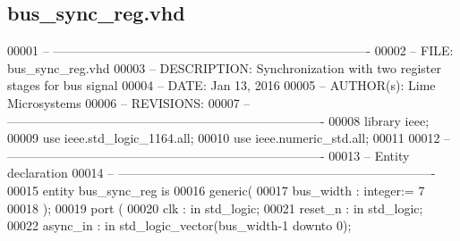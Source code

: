 \subsection{bus\+\_\+sync\+\_\+reg.\+vhd}
\label{bus__sync__reg_8vhd_source}

\begin{DoxyCode}
00001 \textcolor{keyword}{-- ---------------------------------------------------------------------------- }
00002 \textcolor{keyword}{-- FILE:    bus\_sync\_reg.vhd}
00003 \textcolor{keyword}{-- DESCRIPTION: Synchronization with two register stages for bus signal}
00004 \textcolor{keyword}{-- DATE:    Jan 13, 2016}
00005 \textcolor{keyword}{-- AUTHOR(s):   Lime Microsystems}
00006 \textcolor{keyword}{-- REVISIONS:}
00007 \textcolor{keyword}{-- ---------------------------------------------------------------------------- }
00008 \textcolor{vhdlkeyword}{library }\textcolor{keywordflow}{ieee};
00009 \textcolor{vhdlkeyword}{use }ieee.std\_logic\_1164.\textcolor{keywordflow}{all};
00010 \textcolor{vhdlkeyword}{use }ieee.numeric\_std.\textcolor{keywordflow}{all};
00011 
00012 \textcolor{keyword}{-- ----------------------------------------------------------------------------}
00013 \textcolor{keyword}{-- Entity declaration}
00014 \textcolor{keyword}{-- ----------------------------------------------------------------------------}
00015 \textcolor{keywordflow}{entity }bus_sync_reg \textcolor{keywordflow}{is}
00016    \textcolor{keywordflow}{generic}\textcolor{vhdlchar}{(}
00017       \textcolor{vhdlchar}{bus_width}   \textcolor{vhdlchar}{:} \textcolor{comment}{integer}\textcolor{vhdlchar}{:=} \textcolor{vhdllogic}{}\textcolor{vhdllogic}{7}
00018    \textcolor{vhdlchar}{)};
00019    \textcolor{keywordflow}{port} \textcolor{vhdlchar}{(}
00020       \textcolor{vhdlchar}{clk}         \textcolor{vhdlchar}{:} \textcolor{keywordflow}{in} \textcolor{comment}{std\_logic};
00021       \textcolor{vhdlchar}{reset_n}     \textcolor{vhdlchar}{:} \textcolor{keywordflow}{in} \textcolor{comment}{std\_logic};
00022       \textcolor{vhdlchar}{async_in}    \textcolor{vhdlchar}{:} \textcolor{keywordflow}{in} \textcolor{comment}{std\_logic\_vector}\textcolor{vhdlchar}{(}\textcolor{vhdlchar}{bus_width}\textcolor{vhdlchar}{-}\textcolor{vhdllogic}{}\textcolor{vhdllogic}{1} \textcolor{keywordflow}{downto} \textcolor{vhdllogic}{}\textcolor{vhdllogic}{0}\textcolor{vhdlchar}{)};

\end{DoxyCode}
